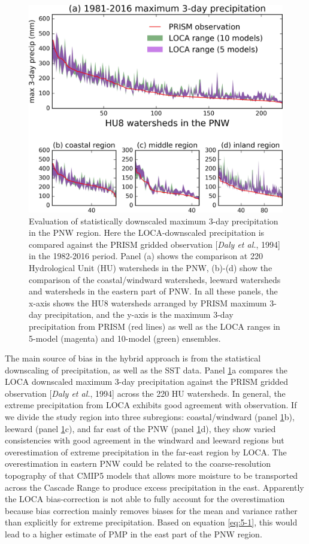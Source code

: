 \begin{figure}[htbp]
	\includegraphics[width=\linewidth]{pics/ch5/fig13.jpg}
	\caption{Evaluation of statistically downscaled maximum 3-day precipitation in the PNW region. Here the LOCA-downscaled precipitation is compared against the PRISM gridded observation [\textit{Daly et al.}, 1994] in the 1982-2016 period. Panel (a) shows the comparison at 220 Hydrological Unit (HU) watersheds in the PNW, (b)-(d) show the comparison of the coastal/windward watersheds, leeward watersheds and watersheds in the eastern part of PNW. In all these panels, the x-axis shows the HU8 watersheds arranged by PRISM maximum 3-day precipitation, and the y-axis is the maximum 3-day precipitation from PRISM (red lines) as well as the LOCA ranges in 5-model (magenta) and 10-model (green) ensembles.}
	\label{fig:5-13}
\end{figure}

The main source of bias in the hybrid approach is from the statistical downscaling of precipitation, as well as the SST data. Panel \ref{fig:5-13}a compares the LOCA downscaled maximum 3-day precipitation against the PRISM gridded observation [\textit{Daly et al.}, 1994] across the 220 HU watersheds. In general, the extreme precipitation from LOCA exhibits good agreement with observation. If we divide the study region into three subregions: coastal/windward (panel \ref{fig:5-13}b), leeward (panel \ref{fig:5-13}c), and far east of the PNW (panel \ref{fig:5-13}d), they show varied consistencies with good agreement in the windward and leeward regions but overestimation of extreme precipitation in the far-east region by LOCA. The overestimation in eastern PNW could be related to the coarse-resolution topography of that CMIP5 models that allows more moisture to be transported across the Cascade Range to produce excess precipitation in the east. Apparently the LOCA bias-correction is not able to fully account for the overestimation because bias correction mainly removes biases for the mean and variance rather than explicitly for extreme precipitation. Based on equation \ref{eq:5-1}, this would lead to a higher estimate of PMP in the east part of the PNW region.

